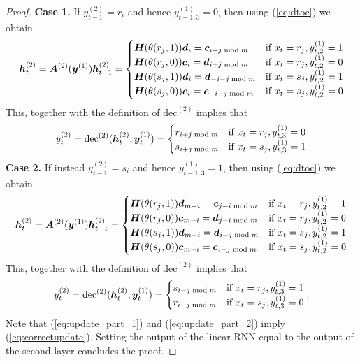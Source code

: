 \documentclass{article} %
\begin{document}
\begin{proof}
\textbf{Case 1.} If $y^{(2)}_{t-1} = r_i$ and hence $y^{(1)}_{t-1,3}= 0 $, then using (\ref{eq:dtoc}) we obtain
\begin{align*}
{\bm{h}}^{(2)}_{t} = {\bm{A}}^{(2)}({\bm{y}}^{(1)}){\bm{h}}^{(2)}_{t-1} =
\begin{cases}
     {\bm{H}}(\theta(r_j,1)){\bm{d}}_i  = {\bm{c}}_{i+j \bmod m} & \text{if } x_t = r_j, y^{(1)}_{t,2} = 1 \\
     {\bm{H}}(\theta(r_j,0)){\bm{c}}_i  = {\bm{d}}_{i+j \bmod m} & \text{if } x_t = r_j, y^{(1)}_{t,2} = 0 \\
     {\bm{H}}(\theta(s_j,1)){\bm{d}}_i  = {\bm{d}}_{-i-j \bmod m}& \text{if } x_t = s_j, y^{(1)}_{t,2} = 1 \\
     {\bm{H}}(\theta(s_j,0)){\bm{c}}_i  = {\bm{c}}_{-i-j \bmod m} & \text{if } x_t = s_j, y^{(1)}_{t,2} = 0
    \end{cases}
\end{align*}
This, together with the definition of $\mathrm{dec}^{(2)}$ implies that
\begin{align}\label{eq:update_part_1}
y^{(2)}_{t} = \mathrm{dec}^{(2)}({\bm{h}}^{(2)}_{t}, {\bm{y}}^{(1)}_{t}) =
\begin{cases}
      r_{i+j \bmod m} & \text{if } x_t = r_j, y^{(1)}_{t,3} = 0 \\
      s_{i+j \bmod m} & \text{if } x_t = s_j, y^{(1)}_{t,3} = 1
    \end{cases}
\end{align}
\textbf{Case 2.} If instead $y^{(2)}_{t-1} = s_i$ and hence $y^{(1)}_{t-1,3}= 1$, then using (\ref{eq:dtoc}) we obtain
\begin{align*}
{\bm{h}}^{(2)}_{t} = {\bm{A}}^{(2)}({\bm{y}}^{(1)}){\bm{h}}^{(2)}_{t-1} =
\begin{cases}
     {\bm{H}}(\theta(r_j,1)){\bm{d}}_{m-i}  = {\bm{c}}_{j-i \bmod m} & \text{if } x_t = r_j, y^{(1)}_{t,2} = 1 \\
     {\bm{H}}(\theta(r_j,0)){\bm{c}}_{m-i}  = {\bm{d}}_{j-i \bmod m} & \text{if } x_t = r_j, y^{(1)}_{t,2} = 0 \\
     {\bm{H}}(\theta(s_j,1)){\bm{d}}_{m-i}  = {\bm{d}}_{i-j \bmod m}& \text{if } x_t = s_j, y^{(1)}_{t,2} = 1 \\
     {\bm{H}}(\theta(s_j,0)){\bm{c}}_{m-i}  = {\bm{c}}_{i-j \bmod m} & \text{if } x_t = s_j, y^{(1)}_{t,2} = 0
    \end{cases}
\end{align*}
This, together with the definition of $\mathrm{dec}^{(2)}$ implies that
\begin{align}\label{eq:update_part_2}
y^{(2)}_{t} = \mathrm{dec}^{(2)}({\bm{h}}^{(2)}_{t}, {\bm{y}}^{(1)}_{t}) =
\begin{cases}
      s_{i-j \bmod m} & \text{if } x_t = r_j, y^{(1)}_{t,3} = 1 \\
     r_{i-j \bmod m} & \text{if } x_t = s_j, y^{(1)}_{t,3} = 0
    \end{cases}.
\end{align}
Note that (\ref{eq:update_part_1}) and (\ref{eq:update_part_2}) imply (\ref{eq:correctupdate}).
Setting the output of the linear RNN equal to the output of the second layer concludes the proof.
\end{proof}
\end{document}
